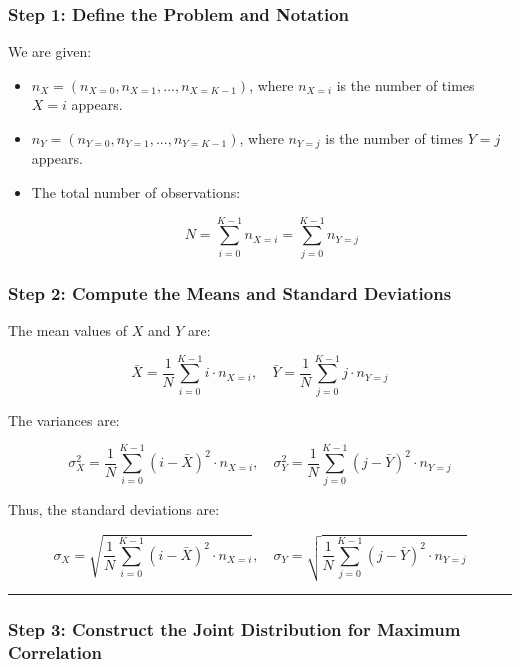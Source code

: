 \documentclass[
  12pt,
  letterpaper,
  DIV=11,
  numbers=noendperiod]{scrartcl}
\begin{document}
\subsubsection{\texorpdfstring{\textbf{Step 1: Define the Problem and
Notation}}{Step 1: Define the Problem and Notation}}\label{step-1-define-the-problem-and-notation-1}

We are given:

\begin{itemize}
\item
  \(n_X = (n_{X=0}, n_{X=1}, ..., n_{X=K-1})\), where \(n_{X=i}\) is the
  number of times \(X = i\) appears.
\item
  \(n_Y = (n_{Y=0}, n_{Y=1}, ..., n_{Y=K-1})\), where \(n_{Y=j}\) is the
  number of times \(Y = j\) appears.
\item
  The total number of observations:

  \[N = \sum_{i=0}^{K-1} n_{X=i} = \sum_{j=0}^{K-1} n_{Y=j}\]
\end{itemize}

\subsubsection{\texorpdfstring{\textbf{Step 2: Compute the Means and
Standard
Deviations}}{Step 2: Compute the Means and Standard Deviations}}\label{step-2-compute-the-means-and-standard-deviations-1}

The mean values of \(X\) and \(Y\) are:

\[\bar{X} = \frac{1}{N} \sum_{i=0}^{K-1} i \cdot n_{X=i}, \quad  
\bar{Y} = \frac{1}{N} \sum_{j=0}^{K-1} j \cdot n_{Y=j}\]

The variances are:

\[\sigma_X^2 = \frac{1}{N} \sum_{i=0}^{K-1} (i - \bar{X})^2 \cdot n_{X=i}, \quad  
\sigma_Y^2 = \frac{1}{N} \sum_{j=0}^{K-1} (j - \bar{Y})^2 \cdot n_{Y=j}\]

Thus, the standard deviations are:

\[\sigma_X = \sqrt{\frac{1}{N} \sum_{i=0}^{K-1} (i - \bar{X})^2 \cdot n_{X=i}}, \quad  
\sigma_Y = \sqrt{\frac{1}{N} \sum_{j=0}^{K-1} (j - \bar{Y})^2 \cdot n_{Y=j}}\]

\begin{center}\rule{0.5\linewidth}{0.5pt}\end{center}

\subsubsection{\texorpdfstring{\textbf{Step 3: Construct the Joint
Distribution for Maximum
Correlation}}{Step 3: Construct the Joint Distribution for Maximum Correlation}}\label{step-3-construct-the-joint-distribution-for-maximum-correlation-1}
\end{document}
